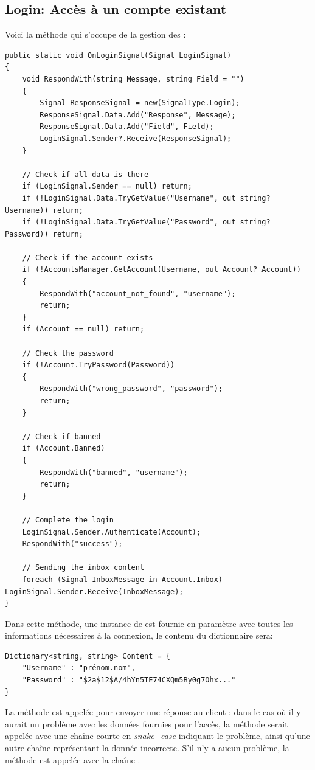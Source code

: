 \documentclass[12pt]{report}
\begin{document}
\subsection{Login: Accès à un compte existant}

Voici la méthode qui s'occupe de la gestion des  :

\begin{verbatim}
public static void OnLoginSignal(Signal LoginSignal)
{
    void RespondWith(string Message, string Field = "")
    {
        Signal ResponseSignal = new(SignalType.Login);
        ResponseSignal.Data.Add("Response", Message);
        ResponseSignal.Data.Add("Field", Field);
        LoginSignal.Sender?.Receive(ResponseSignal);
    }

    // Check if all data is there 
    if (LoginSignal.Sender == null) return;
    if (!LoginSignal.Data.TryGetValue("Username", out string? Username)) return;
    if (!LoginSignal.Data.TryGetValue("Password", out string? Password)) return;

    // Check if the account exists 
    if (!AccountsManager.GetAccount(Username, out Account? Account))
    {
        RespondWith("account_not_found", "username");
        return;
    }
    if (Account == null) return;

    // Check the password 
    if (!Account.TryPassword(Password))
    {
        RespondWith("wrong_password", "password");
        return;
    }

    // Check if banned 
    if (Account.Banned)
    {
        RespondWith("banned", "username");
        return;
    }

    // Complete the login
    LoginSignal.Sender.Authenticate(Account);
    RespondWith("success");

    // Sending the inbox content
    foreach (Signal InboxMessage in Account.Inbox) LoginSignal.Sender.Receive(InboxMessage);
}
\end{verbatim}

Dans cette méthode, une instance de  est fournie en paramètre avec toutes les informations nécessaires à la connexion, le contenu du dictionnaire  sera:
\begin{verbatim}
Dictionary<string, string> Content = {
	"Username" : "prénom.nom",
	"Password" : "$2a$12$A/4hYn5TE74CXQm5By0g7Ohx..."
}
\end{verbatim}

La méthode  est appelée pour envoyer une réponse au client : dans le cas où il y aurait un problème avec les données fournies pour l’accès, la méthode serait appelée avec une chaîne courte en \textit{snake\_case} indiquant le problème, ainsi qu’une autre chaîne représentant la donnée incorrecte. S’il n’y a aucun problème, la méthode est appelée avec la chaîne .
\end{document}
